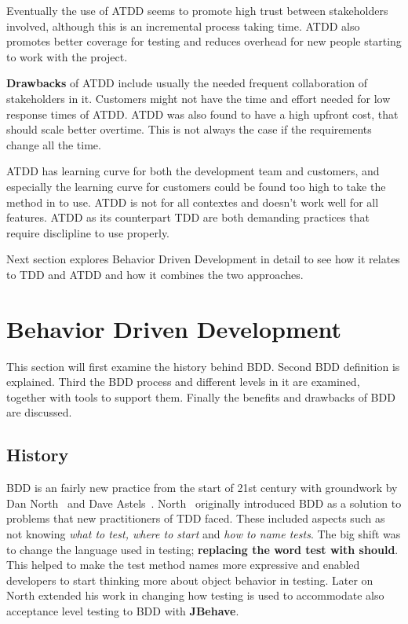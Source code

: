     Eventually the use of ATDD seems to promote high trust between stakeholders involved, although
    this is an incremental process taking time. ATDD also promotes better coverage for testing
    and reduces overhead for new people starting to work with the project. ~\cite{haugset2012automated}

    \textbf{Drawbacks} of ATDD include usually the needed frequent collaboration of stakeholders in it. Customers
    might not have the time and effort needed for low response times of ATDD. ATDD was also found to have a high
    upfront cost, that should scale better overtime. This is not always the case if the requirements change all the time. ~\cite{haugset2012automated}

    ATDD has learning curve for both the development team and customers, and especially the learning curve for customers
    could be found too high to take the method in to use. ATDD is not for all contextes and doesn't work well for all features.
    ATDD as its counterpart TDD are both demanding practices that require
    disclipline to use properly.~\cite{haugset2012automated}

    Next section explores Behavior Driven Development
    in detail to see how it relates to TDD and ATDD and how it combines the two approaches.
\clearpage
\section{Behavior Driven Development} %
    This section will first examine the history behind BDD. Second BDD definition is explained.
    Third the BDD process and different levels in it are examined, together with tools to support them. Finally
    the benefits and drawbacks of BDD are discussed.

    \subsection{History}
    BDD is an fairly new practice from the start of 21st century with groundwork by Dan North~\cite{bdd2006north} and Dave Astels~\cite{astels2006new}.
    North~\cite{bdd2006north} originally introduced BDD as a solution to problems that new practitioners of TDD faced.
    These included aspects such as not knowing \textit{what to test, where to start} and \textit{how to name tests}. The
    big shift was to change the language used in testing; \textbf{replacing the word test with should}. This helped to make
    the test method names more expressive and enabled developers to start thinking more about object behavior in testing.
    Later on North extended his work in changing how testing is used to accommodate also acceptance level testing to BDD with \textbf{JBehave}.


